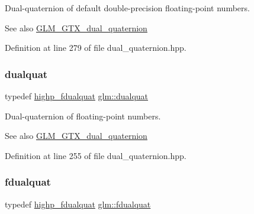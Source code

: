 Dual-\/quaternion of default double-\/precision floating-\/point numbers.

\begin{DoxySeeAlso}{See also}
\hyperlink{group__gtc__dual__quaternion}{G\+L\+M\+\_\+\+G\+T\+X\+\_\+dual\+\_\+quaternion} 
\end{DoxySeeAlso}


Definition at line 279 of file dual\+\_\+quaternion.\+hpp.

\mbox{\label{group__gtc__dual__quaternion_ga2f6227b5f9dc08a2e7682065a84b3aa9}} 
\subsubsection{\texorpdfstring{dualquat}{dualquat}}
{\footnotesize\ttfamily typedef \hyperlink{group__gtc__dual__quaternion_ga2ed3283c09d3ffaf52a0e0a4b248eab6}{highp\+\_\+fdualquat} \hyperlink{group__gtc__dual__quaternion_ga2f6227b5f9dc08a2e7682065a84b3aa9}{glm\+::dualquat}}

Dual-\/quaternion of floating-\/point numbers.

\begin{DoxySeeAlso}{See also}
\hyperlink{group__gtc__dual__quaternion}{G\+L\+M\+\_\+\+G\+T\+X\+\_\+dual\+\_\+quaternion} 
\end{DoxySeeAlso}


Definition at line 255 of file dual\+\_\+quaternion.\+hpp.

\mbox{\label{group__gtc__dual__quaternion_ga436906129bc69ca5059555cafcbac9fd}} 
\subsubsection{\texorpdfstring{fdualquat}{fdualquat}}
{\footnotesize\ttfamily typedef \hyperlink{group__gtc__dual__quaternion_ga2ed3283c09d3ffaf52a0e0a4b248eab6}{highp\+\_\+fdualquat} \hyperlink{group__gtc__dual__quaternion_ga436906129bc69ca5059555cafcbac9fd}{glm\+::fdualquat}}

